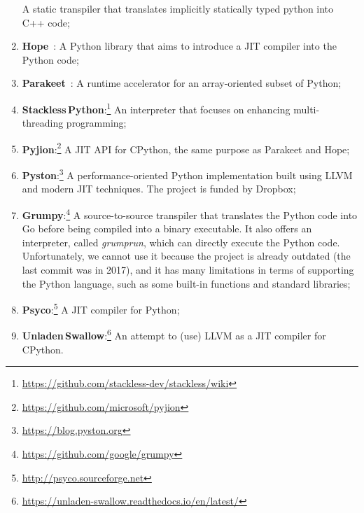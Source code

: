 \begin{enumerate}
            A static transpiler that translates implicitly statically typed python into C++ code;
      \item \textbf{Hope}~\cite{akeret_hope_2015}:
            A Python library that aims to introduce a JIT compiler into the Python code;
      \item \textbf{Parakeet}~\cite{rubinsteyn2012parakeet}:
            A runtime accelerator for an array-oriented subset of Python;
      \item \textbf{Stackless\,Python}:\footnote{\url{https://github.com/stackless-dev/stackless/wiki}}
            An interpreter that focuses on enhancing multi-threading programming;
      \item \textbf{Pyjion}:\footnote{\url{https://github.com/microsoft/pyjion}}
            A JIT API for CPython, the same purpose as Parakeet and Hope;
      \item \textbf{Pyston}:\footnote{\url{https://blog.pyston.org}}
            A performance-oriented Python implementation built using LLVM and modern JIT techniques.
            The project is funded by Dropbox;
      \item \textbf{Grumpy}:\footnote{\url{https://github.com/google/grumpy}}
            A source-to-source transpiler that translates the Python code into Go before being compiled into a binary executable.
            It also offers an interpreter, called \emph{grumprun}, which can directly execute the Python code.
            Unfortunately, we cannot use it because the project is already outdated (the last commit was in 2017), and it has many limitations in terms of supporting the Python language, such as some built-in functions and standard libraries;
      \item \textbf{Psyco}:\footnote{\url{http://psyco.sourceforge.net}}
            A JIT compiler for Python;
      \item \textbf{Unladen\,Swallow}:\footnote{\url{https://unladen-swallow.readthedocs.io/en/latest/}}
            An attempt to (use) LLVM as a JIT compiler for CPython.
\end{enumerate}


